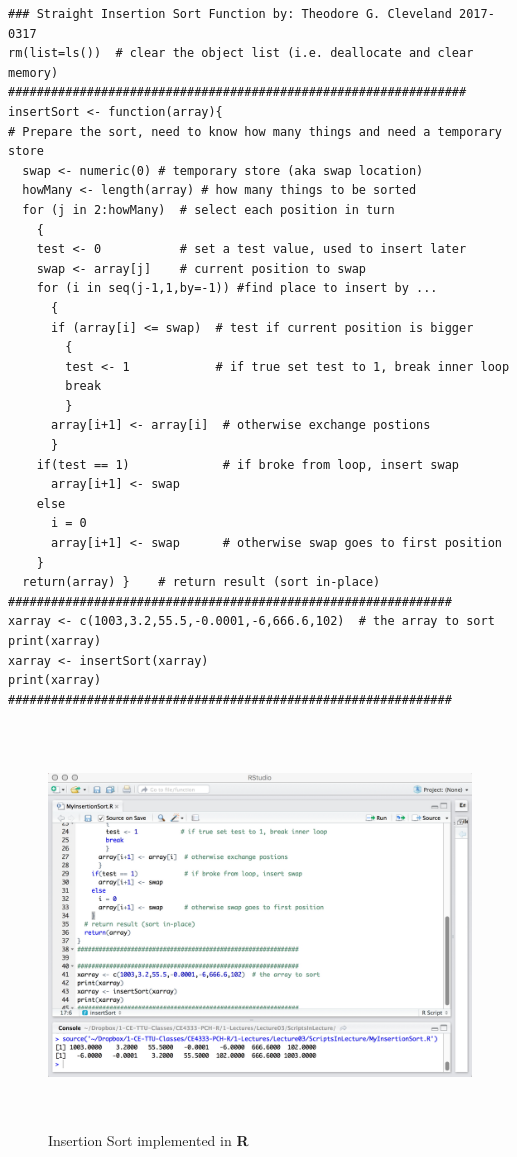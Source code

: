 \begin{lstlisting}[caption=R code demonstrating the insertion sort, label=lst:MyInsertionSort.R]
### Straight Insertion Sort Function by: Theodore G. Cleveland 2017-0317
rm(list=ls())  # clear the object list (i.e. deallocate and clear memory)
################################################################
insertSort <- function(array){
# Prepare the sort, need to know how many things and need a temporary store
  swap <- numeric(0) # temporary store (aka swap location)
  howMany <- length(array) # how many things to be sorted
  for (j in 2:howMany)  # select each position in turn
    {
    test <- 0           # set a test value, used to insert later
    swap <- array[j]    # current position to swap
    for (i in seq(j-1,1,by=-1)) #find place to insert by ...
      {
      if (array[i] <= swap)  # test if current position is bigger
        {
        test <- 1            # if true set test to 1, break inner loop
        break
        }
      array[i+1] <- array[i]  # otherwise exchange postions
      }
    if(test == 1)             # if broke from loop, insert swap
      array[i+1] <- swap      
    else
      i = 0
      array[i+1] <- swap      # otherwise swap goes to first position
    }
  return(array) }    # return result (sort in-place)
##############################################################
xarray <- c(1003,3.2,55.5,-0.0001,-6,666.6,102)  # the array to sort
print(xarray)
xarray <- insertSort(xarray)
print(xarray)
##############################################################
\end{lstlisting}  


\begin{figure}[h!] %
   \centering
   \includegraphics[height=4.2in]{./2-Algorithms/MyInsertionSort.jpg} 
   \caption{Insertion Sort implemented in \textbf{R}}
   \label{fig:MyInsertionSort.jpg}
\end{figure}

